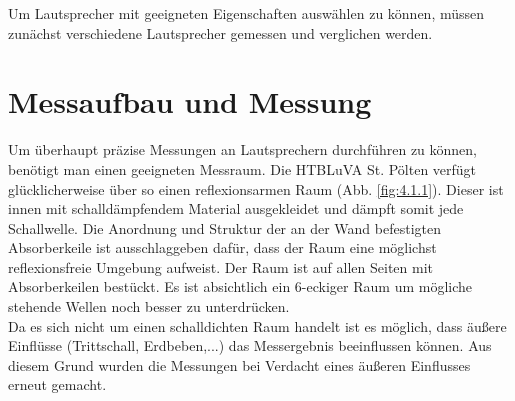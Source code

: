 
Um Lautsprecher mit geeigneten Eigenschaften auswählen zu können, müssen zunächst verschiedene Lautsprecher gemessen und verglichen werden.

\section{Messaufbau und Messung}\label{sec:4.1}
Um überhaupt präzise Messungen an Lautsprechern durchführen zu können, benötigt man einen geeigneten Messraum.
Die HTBLuVA St. Pölten verfügt glücklicherweise über so einen reflexionsarmen Raum (Abb. \ref{fig:4.1.1}).
Dieser ist innen mit schalldämpfendem Material ausgekleidet und dämpft somit jede Schallwelle.
Die Anordnung und Struktur der an der Wand befestigten Absorberkeile ist ausschlaggeben dafür, dass der Raum eine möglichst reflexionsfreie Umgebung aufweist.
Der Raum ist auf allen Seiten mit Absorberkeilen bestückt.
Es ist absichtlich ein 6-eckiger Raum um mögliche stehende Wellen noch besser zu unterdrücken.\\
Da es sich nicht um einen schalldichten Raum handelt ist es möglich, dass äußere Einflüsse (Trittschall, Erdbeben,...) das Messergebnis beeinflussen können.
Aus diesem Grund wurden die Messungen bei Verdacht eines äußeren Einflusses erneut gemacht.

